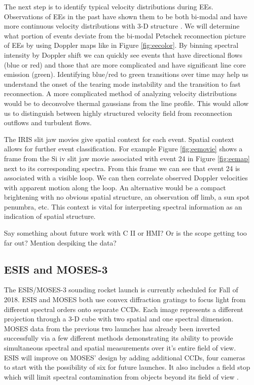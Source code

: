 \documentclass[]{aastex6}
\begin{document}
	
	The next step is to identify typical velocity distributions during EEs.  Observations of EEs in the past have shown them to be both bi-modal \citep{Innes1997,Rust2017} and have more continuous velocity distributions with 3-D structure \citep{Fox2010,Innes2015,Rouppe2017}.  We will determine what portion of events deviate from the bi-modal Petschek reconnection picture of EEs by using Doppler maps like in Figure \ref{fig:eecolor}. By binning spectral intensity by Doppler shift we can quickly see events that have directional flows (blue or red) and those that are more complicated and have significant line core emission (green).  Identifying blue/red to green transitions over time may help us understand the onset of the tearing mode instability and the transition to fast reconnection.  A more complicated method of analyzing velocity distributions would be to deconvolve thermal gaussians from the line profile.  This would allow us to distinguish between highly structured velocity field from reconnection outflows and turbulent flows.
	
	The IRIS slit jaw movies give spatial context for each event.  Spatial context allows for further event classification. For example Figure \ref{fig:eemovie} shows a frame from the Si {\sc iv} slit jaw movie associated with event 24 in Figure \ref{fig:eemap} next to its corresponding spectra.  From this frame we can see that event 24 is associated with a visible loop.  We can then correlate observed Doppler velocities with apparent motion along the loop.  An alternative would be a compact brightening with no obvious spatial structure, an observation off limb, a sun spot penumbra, etc.  This context is vital for interpreting spectral information as an indication of spatial structure.
	
	Say something about future work with C II or HMI?  Or is the scope getting too far out?  Mention despiking the data?
	

	\subsection{ESIS and MOSES-3}
	The ESIS/MOSES-3 sounding rocket launch is currently scheduled for Fall of 2018.  ESIS and MOSES both use convex diffraction gratings to focus light from different spectral orders onto separate CCDs.  Each image represents a different projection through a 3-D cube with two spatial and one spectral dimension.  MOSES data from the previous two launches has already been inverted successfully via a few different methods \citep{Fox2010,Courrier2015,Smart2016,Smart2017,Rust2017} demonstrating its ability to provide simultaneous spectral and spatial measurements over it's entire field of view.  ESIS will improve on MOSES' design by adding additional CCDs, four cameras to start with the possibility of six for future launches.  It also includes a field stop which will limit spectral contamination from objects beyond its field of view \citep{Parker2016}.
	
\end{document}
